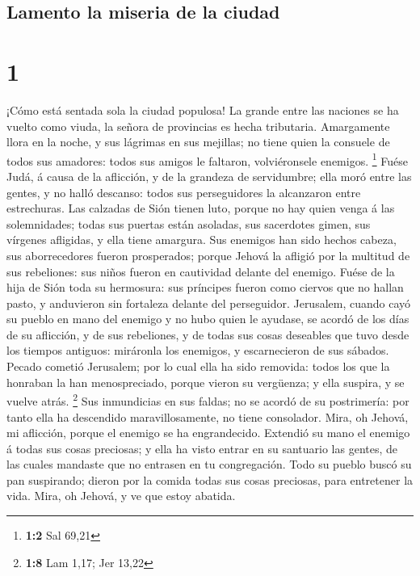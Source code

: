 \hypertarget{lamento-la-miseria-de-la-ciudad}{%
\subsection{Lamento la miseria de la
ciudad}\label{lamento-la-miseria-de-la-ciudad}}

\hypertarget{section}{%
\section{1}\label{section}}

 ¡Cómo está sentada sola la ciudad populosa! La grande entre
las naciones se ha vuelto como viuda, la señora de provincias es hecha
tributaria.  Amargamente llora en la noche, y sus lágrimas
en sus mejillas; no tiene quien la consuele de todos sus amadores: todos
sus amigos le faltaron, volviéronsele enemigos. \footnote{\textbf{1:2}
  Sal 69,21}  Fuése Judá, á causa de la aflicción, y de la
grandeza de servidumbre; ella moró entre las gentes, y no halló
descanso: todos sus perseguidores la alcanzaron entre estrechuras.
 Las calzadas de Sión tienen luto, porque no hay quien venga
á las solemnidades; todas sus puertas están asoladas, sus sacerdotes
gimen, sus vírgenes afligidas, y ella tiene amargura.  Sus
enemigos han sido hechos cabeza, sus aborrecedores fueron prosperados;
porque Jehová la afligió por la multitud de sus rebeliones: sus niños
fueron en cautividad delante del enemigo.  Fuése de la hija
de Sión toda su hermosura: sus príncipes fueron como ciervos que no
hallan pasto, y anduvieron sin fortaleza delante del perseguidor.
 Jerusalem, cuando cayó su pueblo en mano del enemigo y no
hubo quien le ayudase, se acordó de los días de su aflicción, y de sus
rebeliones, y de todas sus cosas deseables que tuvo desde los tiempos
antiguos: miráronla los enemigos, y escarnecieron de sus sábados.
 Pecado cometió Jerusalem; por lo cual ella ha sido
removida: todos los que la honraban la han menospreciado, porque vieron
su vergüenza; y ella suspira, y se vuelve atrás. \footnote{\textbf{1:8}
  Lam 1,17; Jer 13,22}  Sus inmundicias en sus faldas; no se
acordó de su postrimería: por tanto ella ha descendido maravillosamente,
no tiene consolador. Mira, oh Jehová, mi aflicción, porque el enemigo se
ha engrandecido.  Extendió su mano el enemigo á todas sus
cosas preciosas; y ella ha visto entrar en su santuario las gentes, de
las cuales mandaste que no entrasen en tu congregación. 
Todo su pueblo buscó su pan suspirando; dieron por la comida todas sus
cosas preciosas, para entretener la vida. Mira, oh Jehová, y ve que
estoy abatida.

